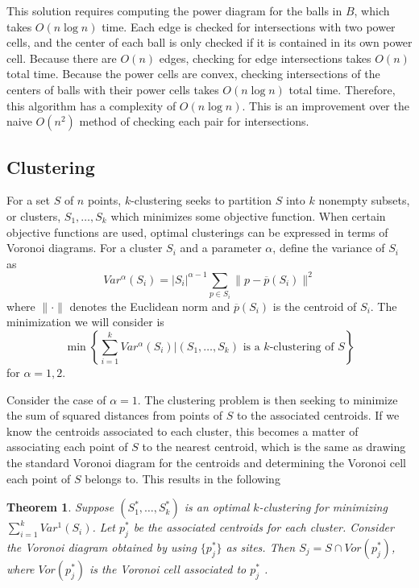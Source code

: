 \documentclass[a4paper, 11pt]{article}
\newtheorem{theorem}{Theorem}[section]
\begin{document}
This solution requires computing the power diagram for the balls in $B$, which takes $O(n \log n)$ time. Each edge is checked for intersections with
two power cells, and the center of each ball is only checked if it is contained in its own power cell. Because there are $O(n)$ edges, checking for
edge intersections takes $O(n)$ total time. Because the power cells are convex, checking intersections of the centers of balls with their power cells
takes $O(n \log n)$ total time. Therefore, this algorithm has a complexity of $O(n \log n)$. This is an improvement over the naive $O(n^2)$ method of
checking each pair for intersections.

\subsection{Clustering}

For a set $S$ of $n$ points, $k$-clustering seeks to partition $S$ into $k$ nonempty subsets, or clusters, $S_1, \dots, S_k$ which minimizes some objective
function. When certain objective functions are used, optimal clusterings can be expressed in terms of Voronoi diagrams. For a cluster $S_i$ and a
parameter $\alpha$, define
the variance of $S_i$ as
\begin{equation}
  Var^\alpha(S_i) = |S_i|^{\alpha-1} \sum_{p \in S_i} \| p - \overline{p}(S_i) \|^2
  \label{def:var}
\end{equation}
where $\| \cdot \|$ denotes the Euclidean norm and $\overline{p}(S_i)$ is the centroid of $S_i$. The minimization we will consider is
\begin{equation}
  \min \left\{ \sum_{i=1}^k Var^\alpha (S_i) | (S_1,\dots, S_k) \text{ is a $k$-clustering of } S \right\}
  \label{eq:cluster}
\end{equation}
for $\alpha = 1,2$.

Consider the case of $\alpha = 1$. The clustering problem is then seeking to minimize the sum of squared distances from points of $S$ to the
associated centroids. If we know the centroids associated to each cluster, this becomes a matter of associating each point of $S$ to the nearest
centroid, which is the same as drawing the standard Voronoi diagram for the centroids and determining the Voronoi cell each point of $S$ belongs to.
This results in the following

\begin{theorem}
  \label{thm:var_1}
  Suppose $(S_1^\ast, \dots, S_k^\ast)$ is an optimal $k$-clustering for minimizing $\sum_{i=1}^k Var^1(S_i)$. Let $p_j^\ast$ be the associated
  centroids for each cluster. Consider the Voronoi diagram obtained by using $\{ p_j^\ast \}$ as sites. Then $S_j = S \cap Vor(p_j^\ast)$, where
  $Vor(p_j^\ast)$ is the Voronoi cell associated to $p_j^\ast$ \cite{inaba_clustering} .
\end{theorem}
\end{document}
